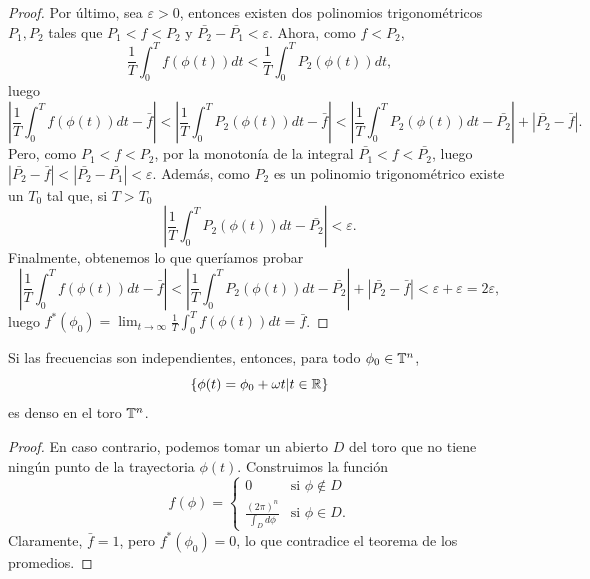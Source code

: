 \begin{proof}
    Por último, sea $\varepsilon>0$, entonces existen dos polinomios trigonométricos $P_1,P_2$ tales que $P_1<f<P_2$ y $\bar{P_2}-\bar{P_1}<\varepsilon$. Ahora, como $f<P_2$,
     \begin{equation*}
       \frac{1}{T}\int_0^T f(\phi(t))dt < \frac{1}{T}\int_0^T P_2(\phi(t))dt,
     \end{equation*}
     luego
     \begin{equation*}
       \left| \frac{1}{T}\int_0^T f(\phi(t))dt- \bar{f} \right| <\left| \frac{1}{T}\int_0^T P_2(\phi(t))dt- \bar{f} \right| < \left| \frac{1}{T}\int_0^T P_2(\phi(t))dt- \bar{P_2}\right| + |\bar{P_2}-\bar{f}|.
     \end{equation*}
     Pero, como $P_1<f<P_2$, por la monotonía de la integral $\bar{P_1}<f<\bar{P_2}$, luego $|\bar{P_2}-\bar{f}|<|\bar{P_2}-\bar{P_1}|<\varepsilon$. Además, como $P_2$ es un polinomio trigonométrico existe un $T_0$ tal que, si $T>T_0$
     \begin{equation*}
       \left| \frac{1}{T}\int_0^T P_2(\phi(t))dt- \bar{P_2}\right| < \varepsilon .
     \end{equation*}
     Finalmente, obtenemos lo que queríamos probar
     \begin{equation*}
       \left| \frac{1}{T}\int_0^T f(\phi(t))dt- \bar{f} \right| <\left| \frac{1}{T}\int_0^T P_2(\phi(t))dt- \bar{P_2}\right| + |\bar{P_2}-\bar{f}|<\varepsilon + \varepsilon = 2\varepsilon,
     \end{equation*}
     luego $f^*(\phi_0)=\lim_{t\rightarrow \infty}\frac{1}{T}\int_0^T f(\phi(t)) dt = \bar{f}$.
\end{proof}
\begin{corol}
  Si las frecuencias son independientes, entonces, para todo $\phi_0 \in \mathbb{T}^n$, \[\{\phi(t)=\phi_0+\omega t|t\in \mathbb{R}\}\] es denso en el toro $\mathbb{T}^n$.
\end{corol}
\begin{proof}
  En caso contrario, podemos tomar un abierto $D$ del toro que no tiene ningún punto de la trayectoria $\phi(t)$. Construimos la función 
  \begin{equation*}
    f(\phi)=\left\lbrace
    \begin{array}{ll}
      0 & \text{si } \phi \not\in D \\
      \frac{(2\pi)^n}{\int_D d\phi} & \text{si } \phi \in D.
    \end{array}
    \right.
  \end{equation*}
  Claramente, $\bar{f}=1$, pero $f^*(\phi_0)=0$, lo que contradice el teorema de los promedios.
\end{proof}
